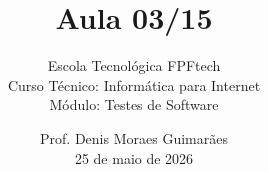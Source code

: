 
\title{Aula 03/15}

\subtitle{
\vspace{1.0cm}
Escola Tecnológica FPFtech\\
\vspace{0.5cm}
Curso Técnico: Informática para Internet\\
\vspace{0.5cm}
Módulo: Testes de Software
\vspace{1.0cm}
}

\author{
Prof. Denis Moraes Guimarães\\
\small 25 de maio de 2026
}

\date{}